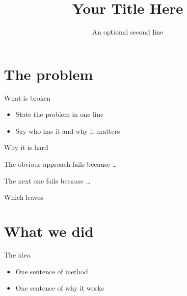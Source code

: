 \documentclass[11pt,aspectratio=43]{beamer}   %
\title{Your Title Here}
\subtitle{An optional second line}
\date{}
\begin{document}
\begin{frame}[plain]
  \titlepage
\end{frame}

\section{The problem}

\begin{frame}{What is broken}
  \begin{itemize}
    \item State the problem in one line
    \item Say who has it and why it matters
  \end{itemize}
\end{frame}

\begin{frame}{Why it is hard}
  \begin{steps}
    \item The obvious approach fails because \ldots
    \item The next one fails because \ldots
    \item Which leaves 
  \end{steps}
\end{frame}

\section{What we did}

\begin{frame}{The idea}
  \begin{figuretext}[0.55]
    \begin{itemize}
      \item One sentence of method
      \item One sentence of why it works
    \end{itemize}
    \nextpane
  \end{figuretext}
\end{frame}
\end{document}
